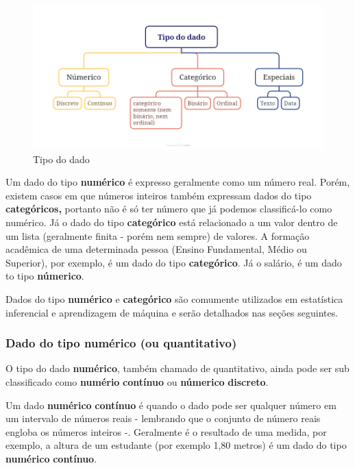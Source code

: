 \documentclass[
]{book}
\begin{document}
\begin{figure}
\centering
\includegraphics[width=5.16667in,height=\textheight]{figuras/tipo_dado.png}
\caption{Tipo do dado}
\end{figure}

Um dado do tipo \textbf{numérico} é expresso geralmente como um número real. Porém, existem casos em que números inteiros também expressam dados do tipo \textbf{categóricos,} portanto não é só ter número que já podemos classificá-lo como numérico. Já o dado do tipo \textbf{categórico} está relacionado a um valor dentro de um lista (geralmente finita - porém nem sempre) de valores. A formação acadêmica de uma determinada pessoa (Ensino Fundamental, Médio ou Superior), por exemplo, é um dado do tipo \textbf{categórico}. Já o salário, é um dado to tipo \textbf{númerico}.

Dados do tipo \textbf{numérico} e \textbf{categórico} são comumente utilizados em estatística inferencial e aprendizagem de máquina e serão detalhados nas seções seguintes.

\hypertarget{dado-do-tipo-numuxe9rico-ou-quantitativo}{%
\subsubsection{Dado do tipo numérico (ou quantitativo)}\label{dado-do-tipo-numuxe9rico-ou-quantitativo}}

O tipo do dado \textbf{numérico}, também chamado de quantitativo, ainda pode ser sub classificado como \textbf{numério} \textbf{contínuo} ou \textbf{númerico} \textbf{discreto}.

Um dado \textbf{numérico} \textbf{contínuo} é quando o dado pode ser qualquer número em um intervalo de números reais - lembrando que o conjunto de número reais engloba os números inteiros -. Geralmente é o resultado de uma medida, por exemplo, a altura de um estudante (por exemplo 1,80 metros) é um dado do tipo \textbf{numérico} \textbf{contínuo}.
\end{document}
